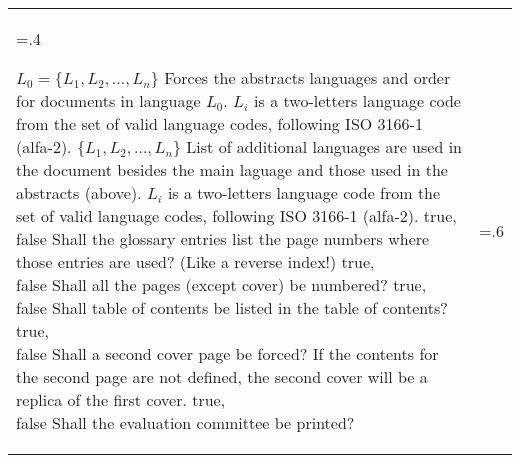 \bgroup
\begin{xltabular}{\linewidth}{>{\hsize=.4\hsize\raggedright\arraybackslash}X>{\hsize=.6\hsize}X}
  \toprule
	    {$L_0 = \{L_1, L_2, …, L_n\}$}%
	    {Forces the abstracts languages and order for documents in language $L_0$.}%
		{%
		$L_i$ is a two-letters language code from the set of valid language codes, following ISO 3166-1 (alfa-2).
	    }
	    \midrule
	    {$\{L_1, L_2, …, L_n\}$}%
	    {List of additional languages are used in the document besides the main laguage and those used in the abstracts (above).}%
		{%
		$L_i$ is a two-letters language code from the set of valid language codes, following ISO 3166-1 (alfa-2).
	    }
	    \midrule
  	  	{true, \newline false}%
	    {Shall the glossary entries list the page numbers where those entries are used?  (Like a reverse index!)}%
		{}
	    \midrule
  	  	{true,\newline false }%
	    {Shall all the pages (except cover) be numbered?}%
		{}
	    \midrule
  	  	{true,\newline false }%
	    {Shall table of contents be listed in the table of contents?}%
		{}
	    \midrule
  	  	{true,\newline false }%
	    {Shall a second cover page be forced?}%
		{If the contents for the second page are not defined, the second cover will be a replica of the first cover.}
	    \midrule
  	  	{true,\newline false}%
	    {Shall the evaluation committee be printed?}%
		{%
	    }

\end{xltabular}
